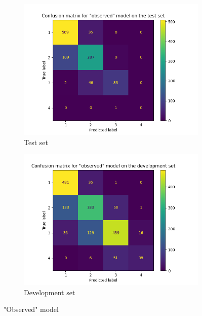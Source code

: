 \documentclass{article}
\begin{document}
\begin{appendices}
	\begin{figure}[h]
		\centering
		\begin{subfigure}[t]{0.49\textwidth}
			\centering
			\includegraphics[width=\textwidth]{sais_confusion_matrix_observed_test.png}
			\caption{Test set}
		\end{subfigure}
		\hfil
		\begin{subfigure}[t]{0.49\textwidth}
			\centering
			\includegraphics[width=\textwidth]{sais_confusion_matrix_observed_development.png}
			\caption{Development set}
		\end{subfigure}
		\caption{"Observed" model}
	\end{figure}

\end{appendices}
	

%   
%    
\nocite{*}
\end{document}
